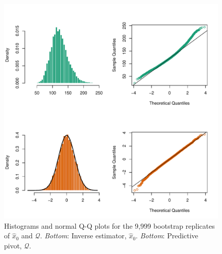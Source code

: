 \documentclass{article}\usepackage[]{graphicx}\usepackage[]{color}
\makeatletter
\def\maxwidth{ %
  \ifdim\Gin@nat@width>\linewidth
    \linewidth
  \else
    \Gin@nat@width
  \fi
}
\newenvironment{knitrout}{}{} %
\makeatother
\begin{document}
\begin{knitrout}
\color{fgcolor}\begin{figure}[]


{\centering \includegraphics[width=\maxwidth]{figure/hist1} 

}

\caption[Histograms and normal Q-Q plots for the 9,999 bootstrap replicates of $\widehat{x}_0$ and $\mathcal{Q}$]{Histograms and normal Q-Q plots for the 9,999 bootstrap replicates of $\widehat{x}_0$ and $\mathcal{Q}$. \textit{Bottom}: Inverse estimator, $\widehat{x}_0$. \textit{Bottom}: Predictive pivot, $\mathcal{Q}$.\label{fig:hist1}}
\end{figure}


\end{knitrout}


 
\end{document}
